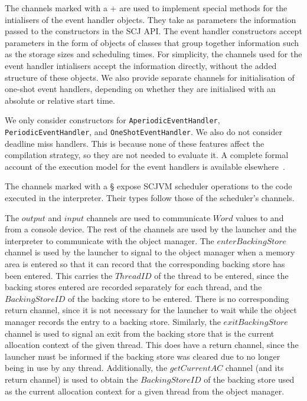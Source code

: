The channels marked with a {}+{} are used to implement special methods
for the intialisers of the event handler objects.
They take as parameters the information passed to the constructors in
the SCJ API.
The event handler constructors accept parameters in the form of
objects of classes that group together information such as the storage
sizes and scheduling times.
For simplicity, the channels used for the event handler intialisers
accept the information directly, without the added structure of these
objects.
We also provide separate channels for initialisation of one-shot event
handlers, depending on whether they are initialised with an absolute
or relative start time.

We only consider constructors for \texttt{AperiodicEventHandler},
\texttt{PeriodicEventHandler}, and \texttt{OneShotEventHandler}.%
We also do not consider deadline miss handlers.
This is because none of these features affect the compilation
strategy, so they are not needed to evaluate it.
A complete formal account of the execution model for the event
handlers is available elsewhere~\cite{cavalcanti2013, luckcuck2016,
  zeyda2011}.

The channels marked with a \S{} expose SCJVM scheduler operations to
the code executed in the interpreter. 
Their types follow those of the scheduler's channels.

The $output$ and $input$ channels are used to communicate $Word$
values to and from a console device.
The rest of the channels are used by the launcher and the interpreter
to communicate with the object manager.
The $enterBackingStore$ channel is used by the launcher to signal to
the object manager when a memory area is entered so that it can record
that the corresponding backing store has been entered.
This carries the $ThreadID$ of the thread to be entered, since the
backing stores entered are recorded separately for each thread, and
the $BackingStoreID$ of the backing store to be entered.
There is no corresponding return channel, since it is not necessary
for the launcher to wait while the object manager records the entry to
a backing store.
Similarly, the $exitBackingStore$ channel is used to signal an exit
from the backing store that is the current allocation context of the
given thread.
This does have a return channel, since the launcher must be informed
if the backing store was cleared due to no longer being in use by any
thread.
Additionally, the $getCurrentAC$ channel (and its return channel) is
used to obtain the $BackingStoreID$ of the backing store used as the
current allocation context for a given thread from the object manager.

